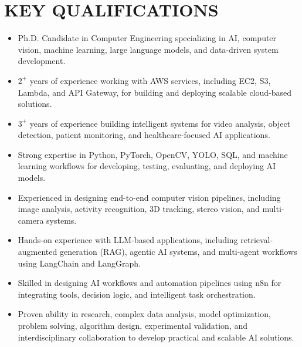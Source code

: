 \documentclass[10pt,a4paper,sans]{moderncv}
\begin{document}
\section{KEY QUALIFICATIONS}
{\begin{itemize}[leftmargin=0.35cm, label={\textbullet}, itemsep=0.3em, parsep=0pt]
\item Ph.D. Candidate in Computer Engineering specializing in AI, computer vision, machine learning, large language models, and data-driven system development.
\item $2^+$ years of experience working with AWS services, including EC2, S3, Lambda, and API Gateway, for building and deploying scalable cloud-based solutions.
\item $3^+$ years of experience building intelligent systems for video analysis, object detection, patient monitoring, and healthcare-focused AI applications.
\item Strong expertise in Python, PyTorch, OpenCV, YOLO, SQL, and machine learning workflows for developing, testing, evaluating, and deploying AI models.
\item Experienced in designing end-to-end computer vision pipelines, including image analysis, activity recognition, 3D tracking, stereo vision,  and multi-camera systems.
\item Hands-on experience with LLM-based applications, including retrieval-augmented generation (RAG), agentic AI systems, and multi-agent workflows using LangChain and LangGraph.
\item Skilled in designing AI workflows and automation pipelines using n8n for integrating tools, decision logic, and intelligent task orchestration.
\item Proven ability in research, complex data analysis, model optimization, problem solving, algorithm design, experimental validation, and interdisciplinary collaboration to develop practical and scalable AI solutions.
\end{itemize}}
\end{document}

